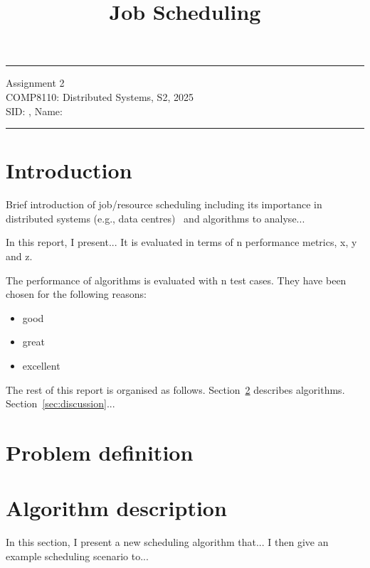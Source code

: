 \documentclass[a4paper]{article} %
\begin{document}

\title{Job Scheduling} %
\fancyhead[C]{}
\hrule \medskip %
\begin{minipage}{1\textwidth} %
\centering 
\large %
Assignment 2\\ %
COMP8110: Distributed Systems, S2, 2025\\
\normalsize %
SID: , Name:
\end{minipage}
\medskip\hrule %
\bigskip

\section{Introduction}
Brief introduction of job/resource scheduling including its importance in distributed systems (e.g., data centres)~\cite{mesos2011} and algorithms to analyse...

In this report, I present... It is evaluated in terms of n performance metrics, x, y and z. 

The performance of algorithms is evaluated with n test cases. They have been chosen for the following reasons:
\begin{itemize}
\item good
\item great
\item excellent
\end{itemize}

The rest of this report is organised as follows. Section~\ref{sec:problem} describes algorithms. Section~\ref{sec:discussion}...

\section{Problem definition}
\label{sec:problem}

\section{Algorithm description}
\label{sec:algo}
In this section, I present a new scheduling algorithm that... I then give an example scheduling scenario to...
\end{document}

